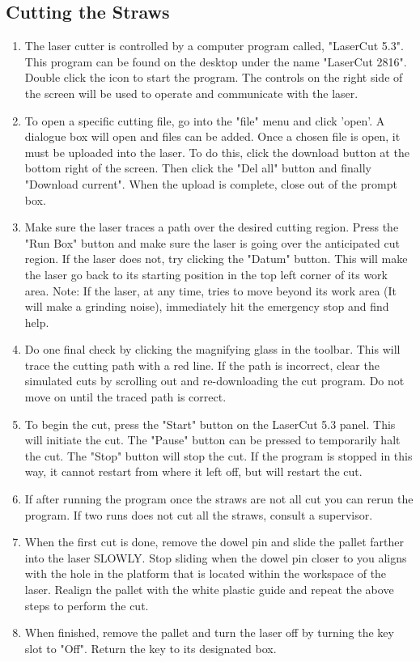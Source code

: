 \documentclass[A4,12pt]{article}
\begin{document}
    \subsection{Cutting the Straws}
    \begin{enumerate}
    \item The laser cutter is controlled by a computer program called, "LaserCut 5.3".  This program can be found on the desktop under the name "LaserCut 2816".  Double click the icon to start the program.  The controls on the right side of the screen will be used to operate and communicate with the laser.
    \item To open a specific cutting file, go into the "file" menu and click 'open'.  A dialogue box will open and files can be added.  Once a chosen file is open, it must be uploaded into the laser.  To do this, click the download button at the bottom right of the screen.  Then click the "Del all" button and finally "Download current".  When the upload is complete, close out of the prompt box.
    \item Make sure the laser traces a path over the desired cutting region.  Press the "Run Box" button and make sure the laser is going over the anticipated cut region.  If the laser does not, try clicking the "Datum" button.  This will make the laser go back to its starting position in the top left corner of its work area.  Note: If the laser, at any time, tries to move beyond its work area (It will make a grinding noise), immediately hit the emergency stop and find help.  
    \item Do one final check by clicking the magnifying glass in the toolbar.  This will trace the cutting path with a red line.  If the path is incorrect, clear the simulated cuts by scrolling out and re-downloading the cut program.  Do not move on until the traced path is correct.
    \item To begin the cut, press the "Start" button on the LaserCut 5.3 panel.  This will initiate the cut.  The "Pause" button can be pressed to temporarily halt the cut.  The "Stop" button will stop the cut.  If the program is stopped in this way, it cannot restart from where it left off, but will restart the cut.
    \item If after running the program once the straws are not all cut you can rerun the program.  If two runs does not cut all the straws, consult a supervisor.
    \item When the first cut is done, remove the dowel pin and slide the pallet farther into the laser SLOWLY.  Stop sliding when the dowel pin closer to you aligns with the hole in the platform that is located within the workspace of the laser.  Realign the pallet with the white plastic guide and repeat the above steps to perform the cut.
    \item When finished, remove the pallet and turn the laser off by turning the key slot to "Off".  Return the key to its designated box.
    \end{enumerate}
    
\end{document}
